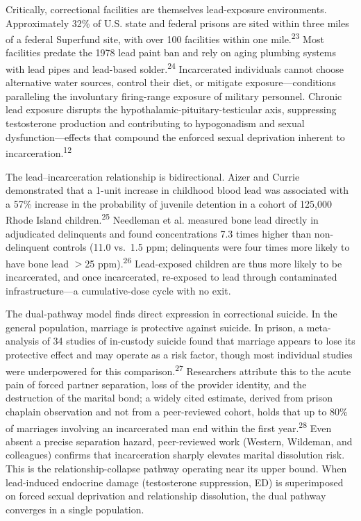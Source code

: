 \documentclass[11pt,twocolumn]{article}
\begin{document}
Critically, correctional facilities are themselves lead-exposure environments. Approximately 32\% of U.S. state and federal prisons are sited within three miles of a federal Superfund site, with over 100 facilities within one mile.\textsuperscript{23} Most facilities predate the 1978 lead paint ban and rely on aging plumbing systems with lead pipes and lead-based solder.\textsuperscript{24} Incarcerated individuals cannot choose alternative water sources, control their diet, or mitigate exposure---conditions paralleling the involuntary firing-range exposure of military personnel. Chronic lead exposure disrupts the hypothalamic-pituitary-testicular axis, suppressing testosterone production and contributing to hypogonadism and sexual dysfunction---effects that compound the enforced sexual deprivation inherent to incarceration.\textsuperscript{12}

The lead--incarceration relationship is bidirectional. Aizer and Currie demonstrated that a 1-unit increase in childhood blood lead was associated with a 57\% increase in the probability of juvenile detention in a cohort of 125,000 Rhode Island children.\textsuperscript{25} Needleman et al. measured bone lead directly in adjudicated delinquents and found concentrations 7.3 times higher than non-delinquent controls (11.0 vs.\ 1.5 ppm; delinquents were four times more likely to have bone lead $>$25 ppm).\textsuperscript{26} Lead-exposed children are thus more likely to be incarcerated, and once incarcerated, re-exposed to lead through contaminated infrastructure---a cumulative-dose cycle with no exit.

The dual-pathway model finds direct expression in correctional suicide. In the general population, marriage is protective against suicide. In prison, a meta-analysis of 34 studies of in-custody suicide found that marriage appears to lose its protective effect and may operate as a risk factor, though most individual studies were underpowered for this comparison.\textsuperscript{27} Researchers attribute this to the acute pain of forced partner separation, loss of the provider identity, and the destruction of the marital bond; a widely cited estimate, derived from prison chaplain observation and not from a peer-reviewed cohort, holds that up to 80\% of marriages involving an incarcerated man end within the first year.\textsuperscript{28} Even absent a precise separation hazard, peer-reviewed work (Western, Wildeman, and colleagues) confirms that incarceration sharply elevates marital dissolution risk. This is the relationship-collapse pathway operating near its upper bound. When lead-induced endocrine damage (testosterone suppression, ED) is superimposed on forced sexual deprivation and relationship dissolution, the dual pathway converges in a single population.
\end{document}
